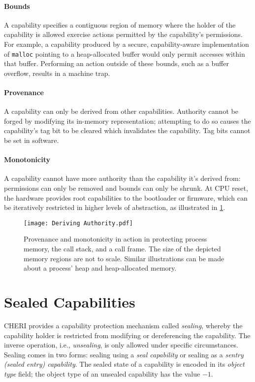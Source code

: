 \documentclass[main.tex]{subfiles}
\begin{document}
\paragraph{Bounds} A capability specifies a contiguous region of memory where the holder of the capability is allowed exercise actions permitted by the capability's permissions. For example, a capability produced by a secure, capability-aware implementation of \texttt{malloc} pointing to a heap-allocated buffer would only permit accesses within that buffer. Performing an action outside of these bounds, such as a buffer overflow, results in a machine trap.

\paragraph{Provenance} A capability can only be derived from other capabilities. Authority cannot be forged by modifying its in-memory representation; attempting to do so causes the capability's tag bit to be cleared which invalidates the capability. Tag bits cannot be set in software.

\paragraph{Monotonicity} A capability cannot have more authority than the capability it's derived from: permissions can only be removed and bounds can only be shrunk. At CPU reset, the hardware provides root capabilities to the bootloader or firmware, which can be iteratively restricted in higher levels of abstraction, as illustrated in \cref{fig:derivingauth}.

\begin{figure}
	\begin{center}
		\texttt{[image: Deriving Authority.pdf]}
	\end{center}
	\caption{Provenance and monotonicity in action in protecting process memory, the call stack, and a call frame. The size of the depicted memory regions are not to scale. Similar illustrations can be made about a process' heap and heap-allocated memory.}
	\label{fig:derivingauth}
\end{figure}

\section{Sealed Capabilities}
CHERI provides a capability protection mechanism called \emph{sealing}, whereby the capability holder is restricted from modifying or dereferencing the capability. The inverse operation, i.e., \emph{unsealing}, is only allowed under specific circumstances. Sealing comes in two forms: sealing using a \emph{seal capability} or sealing as a \emph{sentry (sealed entry) capability}. The sealed state of a capability is encoded in its \emph{object type} field; the object type of an unsealed capability has the value $-1$.
\end{document}
